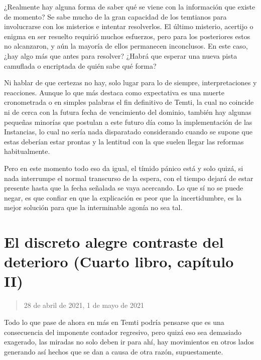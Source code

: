 \documentclass[
]{book}
\begin{document}
¿Realmente hay alguna forma de saber qué se viene con la información que existe de momento? Se sabe mucho de la gran capacidad de los temtianos para involucrarse con los misterios e intentar resolverlos. El último misterio, acertijo o enigma en ser resuelto requirió muchos esfuerzos, pero para los posteriores estos no alcanzaron, y aún la mayoría de ellos permanecen inconclusos. En este caso, ¿hay algo más que antes para resolver? ¿Habrá que esperar una nueva pista camuflada o encriptada de quién sabe qué forma?

Ni hablar de que certezas no hay, solo lugar para lo de siempre, interpretaciones y reacciones. Aunque lo que más destaca como expectativa es una muerte cronometrada o en simples palabras el fin definitivo de Temti, la cual no coincide ni de cerca con la futura fecha de vencimiento del dominio, también hay algunas pequeñas minorías que postulan a este futuro día como la implementación de las Instancias, lo cual no sería nada disparatado considerando cuando se supone que estas deberían estar prontas y la lentitud con la que suelen llegar las reformas habitualmente.

Pero en este momento todo eso da igual, el tímido pánico está y solo quizá, si nada interrumpe el normal transcurso de la espera, con el tiempo dejará de estar presente hasta que la fecha señalada se vaya acercando. Lo que sí no se puede negar, es que confiar en que la explicación es peor que la incertidumbre, es la mejor solución para que la interminable agonía no sea tal.

\hypertarget{el-discreto-alegre-contraste-del-deterioro-cuarto-libro-capuxedtulo-ii}{%
\section{El discreto alegre contraste del deterioro (Cuarto libro, capítulo II)}\label{el-discreto-alegre-contraste-del-deterioro-cuarto-libro-capuxedtulo-ii}}

\begin{quote}
28 de abril de 2021, 1 de mayo de 2021
\end{quote}

Todo lo que pase de ahora en más en Temti podría pensarse que es una consecuencia del imponente contador regresivo, pero quizá eso sea demasiado exagerado, las miradas no solo deben ir para ahí, hay movimientos en otros lados generando así hechos que se dan a causa de otra razón, supuestamente.
\end{document}
